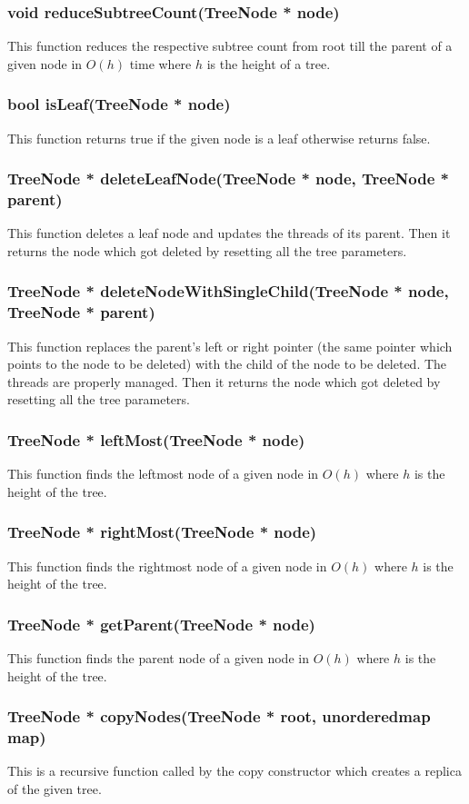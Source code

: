 \documentclass{article}
\begin{document}
\subsubsection{void reduceSubtreeCount(TreeNode * node)}
This function reduces the respective subtree count from root till the parent of a given node in $O(h)$ time where $h$ is the height of a tree.
\subsubsection{bool isLeaf(TreeNode * node)}
This function returns true if the given node is a leaf otherwise returns false.
\subsubsection{TreeNode * deleteLeafNode(TreeNode * node, TreeNode * parent)}
\label{deleteLeaf}
This function deletes a leaf node and updates the threads of its parent. Then it returns the node which got deleted by resetting all the tree parameters.
\subsubsection{TreeNode * deleteNodeWithSingleChild(TreeNode * node, TreeNode * parent)}
\label{deleteSC}
This function replaces the parent's left or right pointer (the same pointer which points to the node to be deleted) with the child of the node to be deleted. The threads are properly managed. Then it returns the node which got deleted by resetting all the tree parameters.
\subsubsection{TreeNode * leftMost(TreeNode * node)}
This function finds the leftmost node of a given node in $O(h)$ where $h$ is the height of the tree.
\subsubsection{TreeNode * rightMost(TreeNode * node)}
This function finds the rightmost node of a given node in $O(h)$ where $h$ is the height of the tree.
\subsubsection{TreeNode * getParent(TreeNode * node)}
This function finds the parent node of a given node in $O(h)$ where $h$ is the height of the tree.
\subsubsection{TreeNode * copyNodes(TreeNode * root, unorderedmap map)}
This is a recursive function called by the copy constructor which creates a replica of the given tree.
\end{document}

